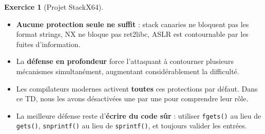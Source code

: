 \documentclass[a4paper,11pt]{article}
\theoremstyle{plain}
\theoremstyle{definition}
\newtheorem{exercice}{Exercice}
\begin{document}
\begin{exercice}[Projet StackX64]
\begin{correction}
\begin{pointcle}
\begin{itemize}
    \item \textbf{Aucune protection seule ne suffit} : stack canaries ne bloquent pas les format strings, NX ne bloque pas ret2libc, ASLR est contournable par les fuites d'information.
    \item La \textbf{défense en profondeur} force l'attaquant à contourner plusieurs mécanismes simultanément, augmentant considérablement la difficulté.
    \item Les compilateurs modernes activent \textbf{toutes} ces protections par défaut. Dans ce TD, nous les avons désactivées une par une pour comprendre leur rôle.
    \item La meilleure défense reste d'\textbf{écrire du code sûr} : utiliser \texttt{fgets()} au lieu de \texttt{gets()}, \texttt{snprintf()} au lieu de \texttt{sprintf()}, et toujours valider les entrées.
\end{itemize}
\end{pointcle}

\end{correction}

\end{exercice}
\end{document}
